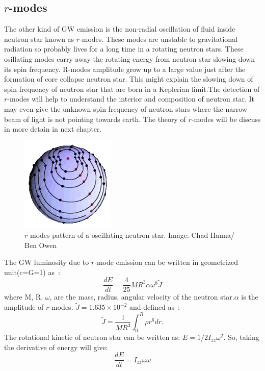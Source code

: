 \documentclass{ttuthes2007}
\begin{document}
\subsection{$r$-modes}
The other kind of \ac{GW} emission is the non-radial oscillation of fluid
inside neutron star known as $r$-modes. These modes are unstable to
gravitational radiation so probably lives for a long time in a rotating neutron
stars. These osillating modes carry away the rotating energy from neutron star
slowing down its spin frequency. R-modes amplitude grow up to a large value just
after the formation of core collapse neutron star. This might explain the
slowing down of spin frequency of neutron star that are born in a Keplerian
limit.The detection of $r$-modes will help to
understand the interior and composition of neutron star. It may even give the
unknown spin frequency of neutron stars where the narrow beam of light is not
pointing towards earth. The theory of $r$-modes will be discuss in more detain in next chapter.
\begin{figure}
\centering
	\includegraphics[width=0.4\textwidth]{figure/333.png}
	\caption{$r$-modes pattern of a oscillating neutron star. Image: Chad
Hanna/ Ben Owen}
\end{figure}
The \ac{GW} luminosity due to $r$-mode emission can be written in geometrized
unit(c=G=1) as~\cite{Owen:2010ng}:
\begin{equation}\label{eq:modeenergy}
\frac{dE}{dt}=\frac{4}{25}M R^3 \alpha \omega^8\tilde{J}
\end{equation}
where M, R, $\omega$, are the mass, radius, angular velocity of the neutron
star.$\alpha$ is the amplitude of $r$-modes. $\tilde{J}=1.635\times10^{-2}$ and
defined as~\cite{Owen:1998xg}:
\begin{equation}
\tilde{J}=\frac{1}{MR^3}\int_0^R\rho r^6dr.
\end{equation}
The rotational kinetic of neutron star can be written as:
$E=1/2I_{zz}\omega^2$. So, taking the derivative of energy will give:
\begin{equation}\label{eq:rotenergy}
\frac{dE}{dt}= I_{zz}\omega\dot{\omega}
\end{equation}
\end{document}
